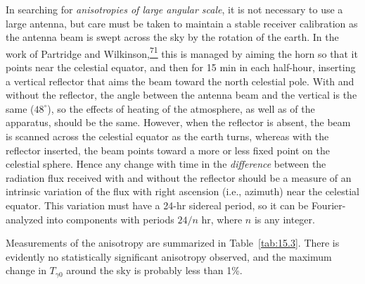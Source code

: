 \endgroup

In searching for \emph{anisotropies of large angular scale}, it is not
necessary to use a large antenna, but care must be taken to maintain a stable
receiver calibration as the antenna beam is swept across the sky by the
rotation of the earth. In the work of Partridge and
Wilkinson,\hyperref[ch15-ref-71]{\textsuperscript{71}} this is managed by
aiming the horn so that it points near the celestial equator, and then for 15
min in each half-hour, inserting a vertical reflector that aims the beam toward
the north celestial pole. With and without the reflector, the angle between the
antenna beam and the vertical is the same (\(48^\circ\)), so the effects of
heating of the atmosphere, as well as of the apparatus, should be the same.
However, when the reflector is absent, the beam is scanned across the celestial
equator as the earth turns, whereas with the reflector inserted, the beam
points toward a more or less fixed point on the celestial sphere. Hence any
change with time in the \emph{difference} between the radiation flux received
with and without the reflector should be a measure of an intrinsic variation
of the flux with right ascension (i.e., azimuth) near the celestial equator.
This variation must have a 24-hr sidereal period, so it can be
Fourier-analyzed into components with periods \(24/n\) hr, where \(n\) is any
integer.

Measurements of the anisotropy are summarized in Table~\ref{tab:15.3}. There
is evidently no statistically significant anisotropy observed, and the maximum
change in \(T_{\gamma0}\) around the sky is probably less than 1\%.

